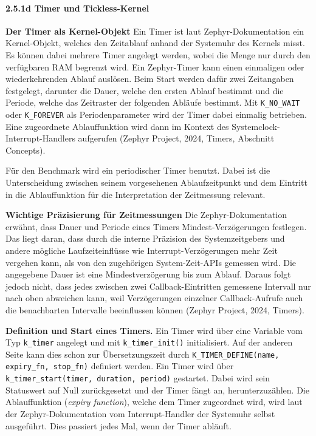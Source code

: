 \paragraph*{\textbf{2.5.1d Timer und Tickless-Kernel}}
\textbf{Der Timer als Kernel-Objekt }Ein Timer ist laut Zephyr-Dokumentation ein Kernel-Objekt, welches den Zeitablauf anhand der Systemuhr des Kernels misst. Es k{\"o}nnen dabei mehrere Timer angelegt werden, wobei die Menge nur durch den verf{\"u}gbaren RAM begrenzt wird. Ein Zephyr-Timer kann einen einmaligen oder wiederkehrenden Ablauf ausl{\"o}sen. Beim Start werden daf{\"u}r zwei Zeitangaben festgelegt, darunter die Dauer, welche den ersten Ablauf bestimmt und die Periode, welche das Zeitraster der folgenden Abl{\"a}ufe bestimmt. Mit \lstinline[style=fileinline]|K_NO_WAIT| oder \lstinline[style=fileinline]|K_FOREVER| als Periodenparameter wird der Timer dabei einmalig betrieben. Eine zugeordnete Ablauffunktion wird dann im Kontext des Systemclock-Interrupt-Handlers aufgerufen (Zephyr Project, 2024, \glqq{}Timers\grqq{}, Abschnitt \glqq{}Concepts\grqq{}).

F{\"u}r den Benchmark wird ein periodischer Timer benutzt. Dabei ist die Unterscheidung zwischen seinem vorgesehenen Ablaufzeitpunkt und dem Eintritt in die Ablauffunktion f{\"u}r die Interpretation der Zeitmessung relevant.

\textbf{Wichtige Pr{\"a}zisierung f{\"u}r Zeitmessungen }Die Zephyr-Dokumentation erw{\"a}hnt, dass Dauer und Periode eines Timers Mindest-Verz{\"o}gerungen festlegen. Das liegt daran, dass durch die interne Pr{\"a}zision des Systemzeitgebers und andere m{\"o}gliche Laufzeiteinfl{\"u}sse wie Interrupt-Verz{\"o}gerungen mehr Zeit vergehen kann, als von den zugeh{\"o}rigen System-Zeit-APIs gemessen wird. Die angegebene Dauer ist eine Mindestverz{\"o}gerung bis zum Ablauf. Daraus folgt jedoch nicht, dass jedes zwischen zwei Callback-Eintritten gemessene Intervall nur nach oben abweichen kann, weil Verz{\"o}gerungen einzelner Callback-Aufrufe auch die benachbarten Intervalle beeinflussen k{\"o}nnen (Zephyr Project, 2024, \glqq{}Timers\grqq{}).

\textbf{Definition und Start eines Timers.} Ein Timer wird {\"u}ber eine Variable vom Typ \lstinline[style=fileinline]|k_timer| angelegt und mit \lstinline[style=fileinline]|k_timer_init()| initialisiert. Auf der anderen Seite kann dies schon zur {\"U}bersetzungszeit durch \lstinline[style=fileinline]|K_TIMER_DEFINE(name, expiry_fn, stop_fn)| definiert werden. Ein Timer wird {\"u}ber \lstinline[style=fileinline]|k_timer_start(timer, duration, period)| gestartet. Dabei wird sein Statuswert auf Null zur{\"u}ckgesetzt und der Timer f{\"a}ngt an, herunterzuz{\"a}hlen. Die Ablauffunktion (\emph{expiry function}), welche dem Timer zugeordnet wird, wird laut der Zephyr-Dokumentation vom Interrupt-Handler der Systemuhr selbst ausgef{\"u}hrt. Dies passiert jedes Mal, wenn der Timer abl{\"a}uft.

